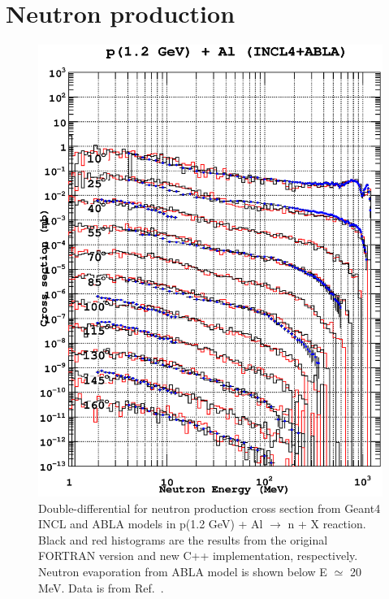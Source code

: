 \documentclass[a4paper]{jpconf}
\begin{document}
\section{Neutron production}

\begin{figure}
\begin{center}
\includegraphics[scale=0.70]{poster/images/aluminum.eps}
\caption{Double-differential for neutron production cross section
    from Geant4 INCL and ABLA models in p(1.2 GeV) + Al $\rightarrow$ n + X reaction.
Black and red histograms are the
    results from the original FORTRAN version and new C++ implementation, respectively. 
Neutron evaporation from ABLA model is shown below E $\simeq$ 20 MeV.
Data is from Ref.~\cite{data}.}
\label{fig:neutronAl}
\end{center}
\end{figure}


\end{document}
